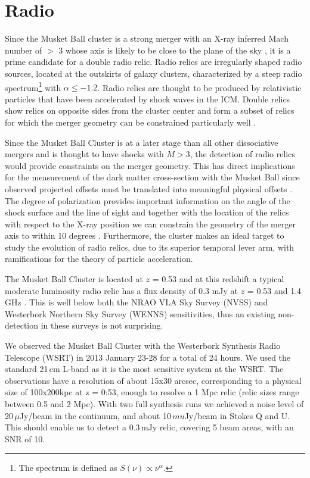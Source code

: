 \section{Radio}

Since the Musket Ball cluster is a strong merger with an X-ray inferred Mach number of $>$ 3 whose axis is likely to be close to the plane of the sky \citep[][and presented in Chapter \ref{chapter:3}]{Dawson:2012ub}, it is a prime candidate for a double radio relic. 
Radio relics are irregularly shaped radio sources, located at the outskirts of galaxy clusters, characterized by a steep radio spectrum\footnote{The spectrum is defined as $S(\nu)\propto\nu^\alpha$.} with $\alpha\leq -1.2$.
Radio relics are thought to be produced by relativistic particles that have been accelerated by shock waves in the ICM.
Double relics show relics on opposite sides from the cluster center and form a subset of relics for which the merger geometry can be constrained particularly well \citep[see e.g.][]{Bonafede:2012fu}.

Since the Musket Ball Cluster is at a later stage than all other dissociative
mergers \citep{Dawson:2012dl} and is thought to have shocks with $M >
3$, the detection of radio relics would provide constraints on the merger geometry. 
This has direct implications for the measurement of the dark matter cross-section with the Musket Ball since observed projected offsets must be translated into meaningful physical offsets \citep[see e.g.][]{Dawson:2012ub}. 
The degree of polarization provides important information on the angle of the shock surface and the line of sight and together with the location of the relics with respect to the X-ray position we can constrain the geometry of the merger axis to within 10 degrees \citep{vanWeeren:2011cd}. 
Furthermore, the cluster makes an ideal target to study the evolution of radio relics, due to its superior temporal lever arm, with ramifications for the theory of particle acceleration. 

The Musket Ball Cluster is located at $z$ = 0.53 and at this redshift a typical moderate luminosity radio relic has a flux density of 0.3 mJy at $z$ = 0.53 and 1.4 GHz \citep{Nuza:2012fu, vanWeeren:2011cd}. 
This is well below both the NRAO VLA Sky Survey (NVSS) and Westerbork Northern Sky Survey (WENNS) sensitivities, thus an existing non-detection in these surveys is not surprising. 

We observed the Musket Ball Cluster with the Westerbork Synthesis Radio Telescope (WSRT) in 2013 January 23-28 for a total of 24 hours.  We used the standard 21\,cm L-band as it is the most sensitive system at the WSRT.
The observations have a resolution of about 15x30 arcsec, corresponding to a physical size of 100x200kpc at z = 0:53, enough to resolve a 1 Mpc relic (relic sizes range between 0.5 and 2 Mpc).
With two full synthesis runs we achieved a noise level of 20\,$\mu$Jy/beam in the continuum, and about 10\,$mu$Jy/beam in Stokes Q and U. 
This should enable us to detect a 0.3\,mJy relic, covering 5 beam areas, with
an SNR of 10. 

